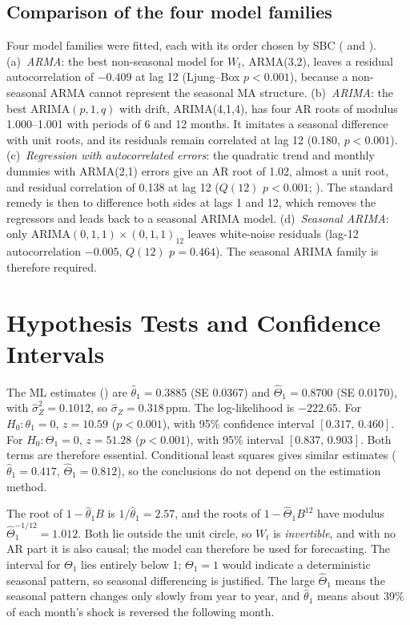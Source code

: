 \documentclass[11pt,letterpaper]{article}
\newcommand{\ppm}{\,ppm}
\begin{document}
\subsection{Comparison of the four model families}
Four model families were fitted, each with its order chosen by SBC ( and ).
(a)~\emph{ARMA}: the best non-seasonal model for $W_t$, ARMA(3,2), leaves a residual autocorrelation of $-0.409$ at lag 12 (Ljung--Box $p<0.001$), because a non-seasonal ARMA cannot represent the seasonal MA structure.
(b)~\emph{ARIMA}: the best ARIMA$(p,1,q)$ with drift, ARIMA(4,1,4), has four AR roots of modulus 1.000--1.001 with periods of 6 and 12 months. It imitates a seasonal difference with unit roots, and its residuals remain correlated at lag 12 (0.180, $p<0.001$).
(c)~\emph{Regression with autocorrelated errors}: the quadratic trend and monthly dummies with ARMA(2,1) errors give an AR root of 1.02, almost a unit root, and residual correlation of 0.138 at lag 12 ($Q(12)$ $p<0.001$; ). The standard remedy is then to difference both sides at lags 1 and 12, which removes the regressors and leads back to a seasonal ARIMA model.
(d)~\emph{Seasonal ARIMA}: only ARIMA$(0,1,1)\times(0,1,1)_{12}$ leaves white-noise residuals (lag-12 autocorrelation $-0.005$, $Q(12)$ $p=0.464$). The seasonal ARIMA family is therefore required.

\section{Hypothesis Tests and Confidence Intervals}
The ML estimates () are $\hat\theta_1 = 0.3885$ (SE 0.0367) and $\hat\Theta_1 = 0.8700$ (SE 0.0170), with $\hat\sigma_Z^2 = 0.1012$, so $\hat\sigma_Z = 0.318$\ppm. The log-likelihood is $-222.65$. For $H_0:\theta_1=0$, $z = 10.59$ ($p<0.001$), with 95\% confidence interval $[0.317,\,0.460]$. For $H_0:\Theta_1=0$, $z = 51.28$ ($p<0.001$), with 95\% interval $[0.837,\,0.903]$. Both terms are therefore essential. Conditional least squares gives similar estimates ($\hat\theta_1 = 0.417$, $\hat\Theta_1 = 0.812$), so the conclusions do not depend on the estimation method.

The root of $1-\hat\theta_1B$ is $1/\hat\theta_1 = 2.57$, and the roots of $1-\hat\Theta_1B^{12}$ have modulus $\hat\Theta_1^{-1/12} = 1.012$. Both lie outside the unit circle, so $W_t$ is \emph{invertible}, and with no AR part it is also causal; the model can therefore be used for forecasting. The interval for $\Theta_1$ lies entirely below 1; $\Theta_1=1$ would indicate a deterministic seasonal pattern, so seasonal differencing is justified. The large $\hat\Theta_1$ means the seasonal pattern changes only slowly from year to year, and $\hat\theta_1$ means about 39\% of each month's shock is reversed the following month.
\end{document}
